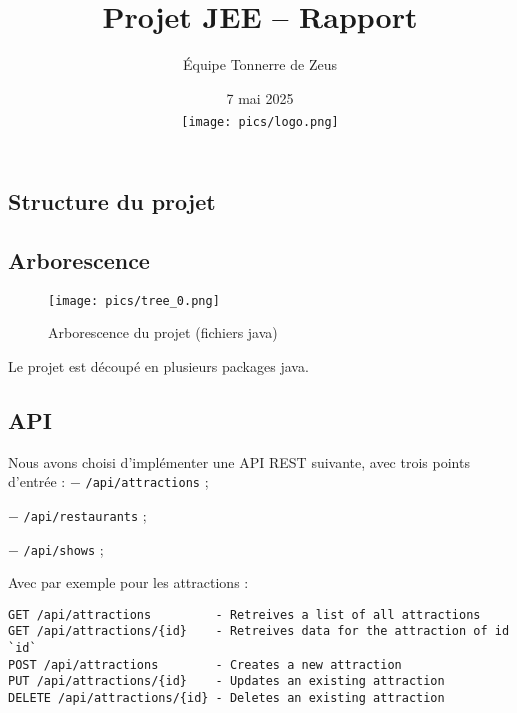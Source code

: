 \documentclass[a4paper, 12pt, twoside]{article}
\title{Projet JEE -- Rapport}
\author{
    Équipe Tonnerre de Zeus
    \\
    \Names
}
\date{
    7 mai 2025
    \\
    $\phantom{a}$
    \\
    \texttt{[image: pics/logo.png]}
}
\begin{document}
    
    \maketitle

    \newpage
    
    \tableofcontents
    \listoffigures
    \newpage

    \begin{indt}{\section{Structure du projet}} %
        \begin{indt}{\subsection{Arborescence}} %
            \begin{figure}[H]
                \centering
            
                \texttt{[image: pics/tree\_0.png]}
            
                \caption{Arborescence du projet (fichiers java)}
            \end{figure}

            Le projet est découpé en plusieurs packages java.
        \end{indt} %

        \begin{indt}{\subsection{API}} %
            \begin{indt}{Nous avons choisi d'implémenter une API REST suivante, avec trois points d'entrée :}
                $-$ \texttt{/api/attractions} ;

                $-$ \texttt{/api/restaurants} ;

                $-$ \texttt{/api/shows} ;
            \end{indt}

            Avec par exemple pour les attractions :

            \begin{lstlisting}[xleftmargin=60pt]
GET /api/attractions         - Retreives a list of all attractions
GET /api/attractions/{id}    - Retreives data for the attraction of id `id`
POST /api/attractions        - Creates a new attraction
PUT /api/attractions/{id}    - Updates an existing attraction
DELETE /api/attractions/{id} - Deletes an existing attraction \end{lstlisting}
        \end{indt} %
    \end{indt} %
\end{document}
